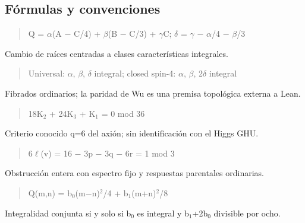 \documentclass[11pt,a4paper]{article}
\begin{document}
\subsection*{Fórmulas y convenciones}
\noindent\begin{minipage}{\linewidth}
\begin{quote}Q = \ensuremath{\alpha}(A \ensuremath{-} C/4) + \ensuremath{\beta}(B \ensuremath{-} C/3) + \ensuremath{\gamma}C; \ensuremath{\delta} = \ensuremath{\gamma} \ensuremath{-} \ensuremath{\alpha}/4 \ensuremath{-} \ensuremath{\beta}/3\end{quote}
Cambio de raíces centradas a clases características integrales.

\end{minipage}\par\medskip
\noindent\begin{minipage}{\linewidth}
\begin{quote}Universal: \ensuremath{\alpha}, \ensuremath{\beta}, \ensuremath{\delta} integral; closed spin-4: \ensuremath{\alpha}, \ensuremath{\beta}, 2\ensuremath{\delta} integral\end{quote}
Fibrados ordinarios; la paridad de Wu es una premisa topológica externa a Lean.

\end{minipage}\par\medskip
\noindent\begin{minipage}{\linewidth}
\begin{quote}18K\ensuremath{{}_{2}} + 24K\ensuremath{{}_{3}} + K\ensuremath{{}_{1}} = 0 mod 36\end{quote}
Criterio conocido q=6 del axión; sin identificación con el Higgs GHU.

\end{minipage}\par\medskip
\noindent\begin{minipage}{\linewidth}
\begin{quote}6\ensuremath{\ell}(v) = 16 \ensuremath{-} 3p \ensuremath{-} 3q \ensuremath{-} 6r = 1 mod 3\end{quote}
Obstrucción entera con espectro fijo y respuestas parentales ordinarias.

\end{minipage}\par\medskip
\noindent\begin{minipage}{\linewidth}
\begin{quote}Q(m,n) = b\ensuremath{{}_{0}}(m\ensuremath{-}n)\ensuremath{{}^{2}}/4 + b\ensuremath{{}_{1}}(m+n)\ensuremath{{}^{2}}/8\end{quote}
Integralidad conjunta si y solo si b\ensuremath{{}_{0}} es integral y b\ensuremath{{}_{1}}+2b\ensuremath{{}_{0}} divisible por ocho.

\end{minipage}\par\medskip
\end{document}
